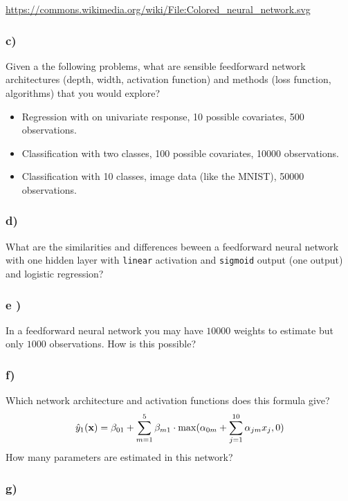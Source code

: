 \documentclass[]{article}
\providecommand{\tightlist}{%
  \setlength{\itemsep}{0pt}\setlength{\parskip}{0pt}}
\begin{document}
\flushleft

\url{https://commons.wikimedia.org/wiki/File:Colored_neural_network.svg}

\subsubsection{c)}\label{c}

Given a the following problems, what are sensible feedforward network
architectures (depth, width, activation function) and methods (loss
function, algorithms) that you would explore?

\begin{itemize}
\tightlist
\item
  Regression with on univariate response, 10 possible covariates, 500
  observations.
\item
  Classification with two classes, 100 possible covariates, 10000
  observations.
\item
  Classification with 10 classes, image data (like the MNIST), 50000
  observations.
\end{itemize}

\subsubsection{d)}\label{d}

What are the similarities and differences beween a feedforward neural
network with one hidden layer with \texttt{linear} activation and
\texttt{sigmoid} output (one output) and logistic regression?

\subsubsection{e )}\label{e}

In a feedforward neural network you may have \(10000\) weights to
estimate but only \(1000\) observations. How is this possible?

\subsubsection{f)}\label{f}

Which network architecture and activation functions does this formula
give?
\[ \hat{y}_1({\bf x})=\beta_{01}+\sum_{m=1}^5 \beta_{m1}\cdot \max(\alpha_{0m}+\sum_{j=1}^{10} \alpha_{jm}x_j,0)\]
How many parameters are estimated in this network?

\subsubsection{g)}\label{g}
\end{document}
